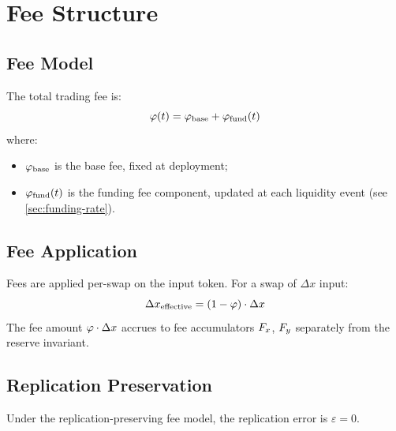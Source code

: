 
\section{Fee Structure}\label{sec:fees}

\subsection{Fee Model}

The total trading fee is:
\begin{equation}\label{eq:total-fee}
  \varphi(t) = \varphi_{\text{base}} + \varphi_{\text{fund}}(t)
\end{equation}
where:
\begin{itemize}
  \item $\varphi_{\text{base}}$ is the base fee, fixed at deployment;
  \item $\varphi_{\text{fund}}(t)$ is the funding fee component, updated at each liquidity event
        (see \cref{sec:funding-rate}).
\end{itemize}

\subsection{Fee Application}

Fees are applied per-swap on the input token. For a swap of $\Delta x$ input:
\begin{equation}\label{eq:fee-application}
  \Delta x_{\text{effective}} = (1 - \varphi) \cdot \Delta x
\end{equation}
The fee amount $\varphi \cdot \Delta x$ accrues to fee accumulators $F_x$, $F_y$
separately from the reserve invariant.

\subsection{Replication Preservation}

\begin{theorem}\label{thm:zero-error}
Under the replication-preserving fee model, the replication error is $\varepsilon = 0$.
\end{theorem}

